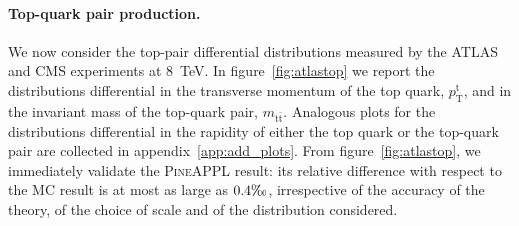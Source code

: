 \paragraph{Top-quark pair production.} We now consider the top-pair differential
distributions measured by the ATLAS and CMS experiments at
\SI{8}{\tera\electronvolt}. In figure~\ref{fig:atlastop} we report the
distributions differential in the transverse momentum of the top quark,
$p_\mathrm{T}^\mathrm{t}$, and in the invariant mass of the top-quark pair,
$m_{\mathrm{t}\bar{\mathrm{t}}}$. Analogous plots for the distributions differential
in the rapidity of either the top quark or the top-quark pair are collected in
appendix~\ref{app:add_plots}. From figure~\ref{fig:atlastop}, we immediately
validate the \textsc{PineAPPL} result: its relative difference with respect to
the MC result is at most as large as $0.4\tcperthousand$, irrespective of the
accuracy of the theory, of the choice of scale and of the distribution
considered.

